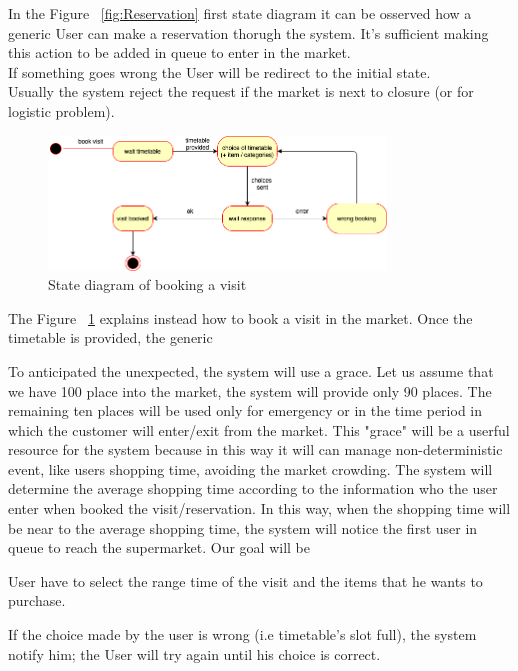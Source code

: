 In the Figure ~\ref{fig:Reservation} first state diagram it can be osserved how a generic User can make a reservation thorugh the system. It's sufficient making this action to be added in queue to enter in the market.
\\If something goes wrong the User will be redirect to the initial state.
\\Usually the system reject the request if the market is next to closure (or for logistic problem).

\par 
\medskip

\begin{figure}[h]
  \caption{State diagram of booking a visit}
  \label{fig:Visit}
  \centering
  \includegraphics[width=0.8\textwidth, height=0.4\textwidth]{diagrams/2-visit.png}
\end{figure}

\par 
\medskip

The Figure ~\ref{fig:Visit} explains instead how to book a visit in the market. Once the timetable is provided, the generic 



To anticipated the unexpected, the system will use a grace.
Let us assume that we have 100 place into the market, the system will provide only 90 places.
The remaining ten places will be used only for emergency or in the time period in which the customer will enter/exit from the market.
This "grace" will be a userful resource for the system because in this way it will can manage non-deterministic event, like users shopping time, avoiding the market crowding. 
The system will determine the average shopping time according to the information who the user enter when booked the visit/reservation.
In this way, when the shopping time will be near to the average shopping time, the system will notice the first user in queue to reach the supermarket.  
Our goal will be 


User have to select the range time of the visit and the items that he wants to purchase. \par If the choice made by the user is wrong (i.e timetable's slot full), the system notify him; the User will try again until his choice is correct.
\par 
\medskip


